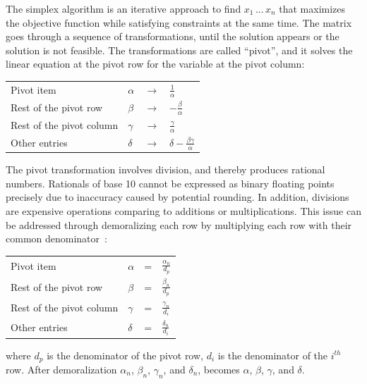 \documentclass[logo,bsc,singlespacing,parskip]{infthesis}
\begin{document}
The simplex algorithm is an iterative approach to find \begin{math} x_1 \, ...
\, x_n\end{math} that maximizes the objective function while satisfying
constraints at the same time. The matrix goes through a sequence of
transformations, until the solution appears or the solution is not feasible. The
transformations are called ``pivot'', and it solves the linear equation at the pivot
row for the variable at the pivot column: 
\vspace*{-4mm}
\begin{table}[H]
\begin{center}
\begin{tabular}{llll}
Pivot item           & $\alpha$ & $\rightarrow$ & $\frac{1}{\alpha}$            \\
Rest of the pivot row    & $\beta$  & $\rightarrow$ & $-\frac{\beta}{\alpha}$            \\
Rest of the pivot column& $\gamma$ & $\rightarrow$ & $\frac{\gamma}{\alpha}$            \\
Other entries         & $\delta$ & $\rightarrow$ & $\delta - \frac{\beta\gamma}{\alpha}$  
\end{tabular}
\end{center}
\end{table}
\vspace*{-8mm}

The pivot transformation involves division, and thereby produces rational
numbers. Rationals of base 10 cannot be expressed as binary floating points
precisely due to inaccuracy caused by potential rounding. In addition, divisions
are expensive operations comparing to additions or multiplications. This issue
can be addressed through demoralizing each row by multiplying each row with
their common denominator~\cite{FPL1}: 
\vspace*{-4mm}
\begin{table}[H]
\begin{center}
\begin{tabular}{llll}
Pivot item           & $\alpha$ & = & $\frac{\alpha_n}{d_p}$            \\
Rest of the pivot row    & $\beta$  & = & $\frac{\beta_n}{d_p}$            \\
Rest of the pivot column& $\gamma$ & = & $\frac{\gamma_n}{d_i}$            \\
Other entries         & $\delta$ & = & $\frac{\delta_n}{d_i}$  
\end{tabular}
\end{center}
\end{table}
\vspace*{-8mm}
where $d_p$ is the denominator of the pivot row, $d_i$ is the denominator of the
$i^{th}$ row. After demoralization $\alpha_n$, $\beta_n$, $\gamma_n$, and
$\delta_n$, becomes $\alpha$, $\beta$, $\gamma$, and $\delta$.
\end{document}
